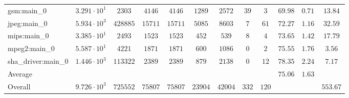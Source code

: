 \begin{tabular}{|l|c|c|c|c|c|c|c|c|c|c|c|}
gsm:main\_0             & $ 3.291 \cdot 10^{1} $ & $ 2303   $ & $ 4146  $ & $ 4146  $ & $ 1289  $ & $ 2572  $ & $ 39  $ & $ 3   $ & $ 69.98       $ & $ 0.71    $ & $ 13.84   $ \\
jpeg:main\_0            & $ 5.934 \cdot 10^{3} $ & $ 428885 $ & $ 15711 $ & $ 15711 $ & $ 5085  $ & $ 8603  $ & $ 7   $ & $ 61  $ & $ 72.27       $ & $ 1.16    $ & $ 32.59   $ \\
mips:main\_0            & $ 3.385 \cdot 10^{1} $ & $ 2493   $ & $ 1523  $ & $ 1523  $ & $ 452   $ & $ 539   $ & $ 8   $ & $ 4   $ & $ 73.65       $ & $ 1.42    $ & $ 17.79   $ \\
mpeg2:main\_0           & $ 5.587 \cdot 10^{1} $ & $ 4221   $ & $ 1871  $ & $ 1871  $ & $ 600   $ & $ 1086  $ & $ 0   $ & $ 2   $ & $ 75.55       $ & $ 1.76    $ & $ 3.56    $ \\
sha\_driver:main\_0     & $ 1.446 \cdot 10^{3} $ & $ 113322 $ & $ 2389  $ & $ 2389  $ & $ 879   $ & $ 2138  $ & $ 0   $ & $ 12  $ & $ 78.35       $ & $ 2.24    $ & $ 7.17    $ \\
\hline
Average                 & $                    $ & $        $ & $       $ & $       $ & $       $ & $       $ & $     $ & $     $ & $ 75.06       $ & $ 1.63    $ & $         $ \\
\hline
Overall                 & $ 9.726 \cdot 10^{3} $ & $ 725552 $ & $ 75807 $ & $ 75807 $ & $ 23904 $ & $ 42004 $ & $ 332 $ & $ 120 $ & $             $ & $         $ & $ 553.67  $ \\
\hline
\end{tabular}
